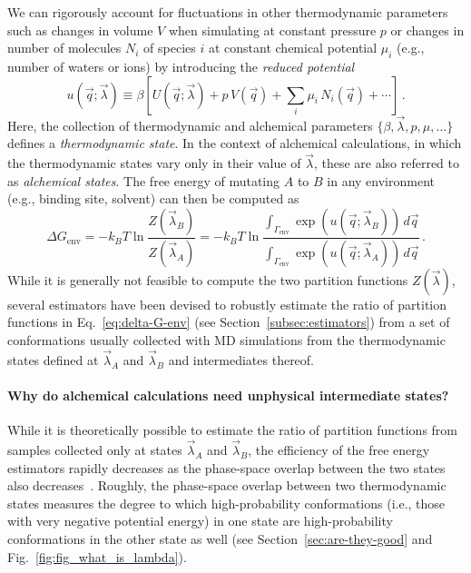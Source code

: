 \documentclass[9pt,bestpractices]{livecoms}
\begin{document}
We can rigorously account for fluctuations in other thermodynamic parameters such as changes in volume $V$ when simulating at constant pressure $p$ or changes in number of molecules $N_i$ of species $i$ at constant chemical potential $\mu_i$ (e.g., number of waters or ions) by introducing the \textit{reduced potential}~\cite{shirts2008statisticallya}
\begin{equation}\label{eq:reduced-potential}
u(\vec{q};\vec{\lambda}) \equiv \beta \left[ U(\vec{q};\vec{\lambda}) + p \, V(\vec{q}) + \sum_i \mu_i \, N_i(\vec{q}) + \cdots \right] \, .
\end{equation}
Here, the collection of thermodynamic and alchemical parameters $\{\beta, \vec{\lambda}, p, \mu, \ldots\}$ defines a \emph{thermodynamic state}.
In the context of alchemical calculations, in which the thermodynamic states vary only in their value of $\vec{\lambda}$, these are also referred to as \emph{alchemical states}.
The free energy of mutating $A$ to $B$ in any environment (e.g., binding site, solvent) can then be computed as
\begin{equation}\label{eq:delta-G-env}
    \Delta G_{\mathrm{env}} = - k_BT \ln \frac{Z(\vec{\lambda}_B)}{Z(\vec{\lambda}_A)} = - k_BT \ln \frac{\int_{\Gamma_{\mathrm{env}}} \exp\left( u(\vec{q}; \vec{\lambda}_B) \right) \, d\vec{q}}{\int_{\Gamma_{\mathrm{env}}} \exp\left( u(\vec{q}; \vec{\lambda}_A) \right) \, d\vec{q}} \, .
\end{equation}
While it is generally not feasible to compute the two partition functions $Z(\vec{\lambda})$, several estimators have been devised to robustly estimate the ratio of partition functions in Eq.~\ref{eq:delta-G-env} (see Section~\ref{subsec:estimators}) from a set of conformations usually collected with MD simulations from the thermodynamic states defined at $\vec{\lambda}_A$ and $\vec{\lambda}_B$ and intermediates thereof.

\paragraph{Why do alchemical calculations need unphysical intermediate states?}
While it is theoretically possible to estimate the ratio of partition functions from samples collected only at states $\vec{\lambda}_A$ and $\vec{\lambda}_B$, the efficiency of the free energy estimators rapidly decreases as the phase-space overlap between the two states also decreases~\cite{wu2005phasespaceb,wu2005phasespacec}.
Roughly, the phase-space overlap between two thermodynamic states measures the degree to which high-probability conformations (i.e., those with very negative potential energy) in one state are high-probability conformations in the other state as well (see Section~\ref{sec:are-they-good} and Fig.~\ref{fig:fig_what_is_lambda}).
\end{document}
